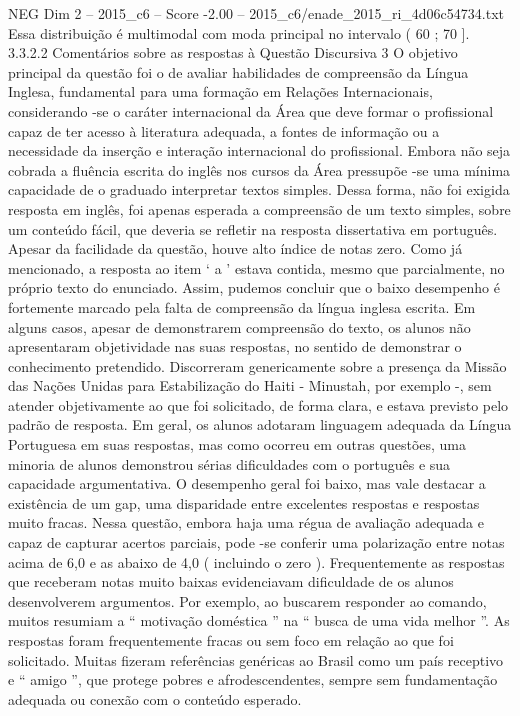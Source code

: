 \begin{textsample}{NEG Dim 2 – 2015\_c6 – Score -2.00 – 2015\_c6/enade\_2015\_ri\_4d06c54734.txt}
Essa distribuição é multimodal com moda principal no intervalo ( 60 ; 70 ]. 3.3.2.2 Comentários sobre as respostas à Questão Discursiva 3 O objetivo principal da questão foi o de avaliar habilidades de compreensão da Língua Inglesa, fundamental para uma formação em Relações Internacionais, considerando -se o caráter internacional da Área que deve formar o profissional capaz de ter acesso à literatura adequada, a fontes de informação ou a necessidade da inserção e interação internacional do profissional.
Embora não seja cobrada a fluência escrita do inglês nos cursos da Área pressupõe -se uma mínima capacidade de o graduado interpretar textos simples.
Dessa forma, não foi exigida resposta em inglês, foi apenas esperada a compreensão de um texto simples, sobre um conteúdo fácil, que deveria se refletir na resposta dissertativa em português.
Apesar da facilidade da questão, houve alto índice de notas zero.
Como já mencionado, a resposta ao item ‘ a ’ estava contida, mesmo que parcialmente, no próprio texto do enunciado.
Assim, pudemos concluir que o baixo desempenho é fortemente marcado pela falta de compreensão da língua inglesa escrita.
Em alguns casos, apesar de demonstrarem compreensão do texto, os alunos não apresentaram objetividade nas suas respostas, no sentido de demonstrar o conhecimento pretendido.
Discorreram genericamente sobre a presença da Missão das Nações Unidas para Estabilização do Haiti - Minustah, por exemplo -, sem atender objetivamente ao que foi solicitado, de forma clara, e estava previsto pelo padrão de resposta.
Em geral, os alunos adotaram linguagem adequada da Língua Portuguesa em suas respostas, mas como ocorreu em outras questões, uma minoria de alunos demonstrou sérias dificuldades com o português e sua capacidade argumentativa.
O desempenho geral foi baixo, mas vale destacar a existência de um gap, uma disparidade entre excelentes respostas e respostas muito fracas.
Nessa questão, embora haja uma régua de avaliação adequada e capaz de capturar acertos parciais, pode -se conferir uma polarização entre notas acima de 6,0 e as abaixo de 4,0 ( incluindo o zero ).
Frequentemente as respostas que receberam notas muito baixas evidenciavam dificuldade de os alunos desenvolverem argumentos.
Por exemplo, ao buscarem responder ao comando, muitos resumiam a “ motivação doméstica ” na “ busca de uma vida melhor ”.
As respostas foram frequentemente fracas ou sem foco em relação ao que foi solicitado.
Muitas fizeram referências genéricas ao Brasil como um país receptivo e “ amigo ”, que protege pobres e afrodescendentes, sempre sem fundamentação adequada ou conexão com o conteúdo esperado.

\end{textsample}
